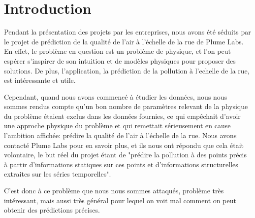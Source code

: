 \section*{Introduction}

Pendant la présentation des projets par les entreprises, nous avons été séduits par le projet de prédiction de la qualité de l'air à l'échelle de la rue de Plume Labs.
En effet, le problème en question est un problème de physique, et l'on peut espérer s'inspirer de son intuition et de modèles physiques pour proposer des solutions.
De plus, l'application, la prédiction de la pollution à l'echelle de la rue, est intéressante et utile.

Cependant, quand nous avons commencé à étudier les données, nous nous sommes rendus compte qu'un bon nombre de paramètres relevant de la physique du problème étaient exclus dans les données fournies, ce qui empêchait d'avoir une approche physique du problème et qui remettait sérieusement en cause l'ambition affichée: prédire la qualité de l'air à l'échelle de la rue.
Nous avons contacté Plume Labs pour en savoir plus, et ils nous ont répondu que cela était volontaire, le but réel du projet étant de "prédire la pollution à des points précis à partir d'informations statiques sur ces points et d'informations structurelles extraites sur les séries temporelles".

C'est donc à ce problème que nous nous sommes attaqués, problème très intéressant, mais aussi très général pour lequel on voit mal comment on peut obtenir des prédictions précises.

